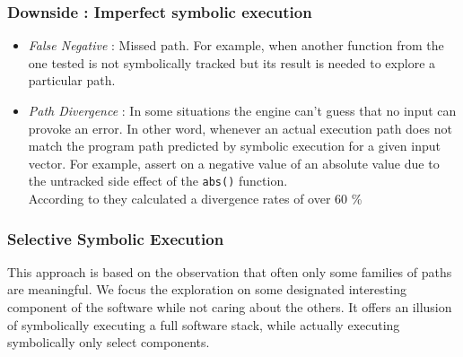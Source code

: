 \documentclass[11pt]{IEEEtran}
\begin{document}
    		\subsubsection*{Downside : Imperfect symbolic execution}
    			\begin{itemize} %
    				\item \emph{False Negative} : Missed path. For example, when another function from the one tested is not symbolically tracked but its result is needed to explore a particular path.
    				\item \emph{Path Divergence} : In some situations the engine can't guess that no input can provoke an error. In other word, whenever an actual execution path does not match the program path predicted by symbolic execution for a given input vector. For example, assert on a negative value of an absolute value due to the untracked side effect of the \texttt{abs()} function.\\
    				According to \cite{Godefroid2008AutomatedWF} they calculated a divergence rates of over 60 \%
    			\end{itemize}

    	\subsubsection{Selective Symbolic Execution}
    	\label{subsec:selectiveSymbolicExec}
    		This approach is based on the observation that often only some families of paths are meaningful\cite{chipounov2012s2e}. We focus the exploration on some designated interesting component of the software while not caring about the others. It offers an illusion of symbolically executing a full software stack, while actually executing symbolically only select components.\\
\end{document}
